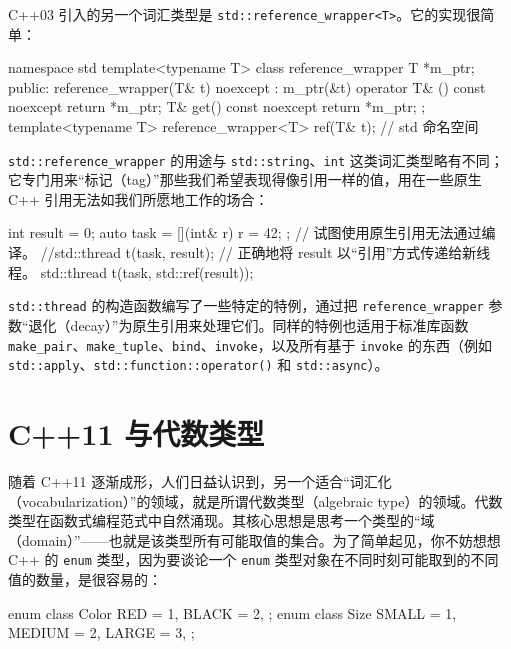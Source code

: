 C++03 引入的另一个词汇类型是 \texttt{std::\allowbreak{}reference\_\allowbreak{}wrapper<\allowbreak{}T>\allowbreak{}}。它的实现很简单：

\begin{codebox}[cpp]
    namespace std {
      template<typename T>
      class reference_wrapper {
        T *m_ptr;
        public:
        reference_wrapper(T& t) noexcept : m_ptr(&t) {}
        operator T& () const noexcept { return *m_ptr; }
        T& get() const noexcept { return *m_ptr; }
      };
      template<typename T>
      reference_wrapper<T> ref(T& t);
    } // std 命名空间
\end{codebox}

\texttt{std::\allowbreak{}reference\_\allowbreak{}wrapper} 的用途与 \texttt{std::\allowbreak{}string}、\texttt{int} 这类词汇类型略有不同；它专门用来“标记（tag）”那些我们希望表现得像引用一样的值，用在一些原生 C++ 引用无法如我们所愿地工作的场合：

\begin{codebox}[cpp]
     int result = 0;
     auto task = [](int& r) {
       r = 42;
     };
     // 试图使用原生引用无法通过编译。
     //std::thread t(task, result);
     // 正确地将 result 以“引用”方式传递给新线程。
     std::thread t(task, std::ref(result));
\end{codebox}

\texttt{std::\allowbreak{}thread} 的构造函数编写了一些特定的特例，通过把 \texttt{reference\_\allowbreak{}wrapper} 参数“退化（decay）”为原生引用来处理它们。同样的特例也适用于标准库函数 \texttt{make\_\allowbreak{}pair}、\texttt{make\_\allowbreak{}tuple}、\texttt{bind}、\texttt{invoke}，以及所有基于 \texttt{invoke} 的东西（例如 \texttt{std::\allowbreak{}apply}、\texttt{std::\allowbreak{}function::\allowbreak{}operator(\allowbreak{})\allowbreak{}} 和 \texttt{std::\allowbreak{}async}）。

\section{C++11 与代数类型}

随着 C++11 逐渐成形，人们日益认识到，另一个适合“词汇化（vocabularization）”的领域，就是所谓代数类型（algebraic type）的领域。代数类型在函数式编程范式中自然涌现。其核心思想是思考一个类型的“域（domain）”——也就是该类型所有可能取值的集合。为了简单起见，你不妨想想 C++ 的 \texttt{enum} 类型，因为要谈论一个 \texttt{enum} 类型对象在不同时刻可能取到的不同值的数量，是很容易的：

\begin{codebox}[cpp]
    enum class Color {
      RED = 1,
      BLACK = 2,
    };
    enum class Size {
      SMALL = 1,
      MEDIUM = 2,
      LARGE = 3,
    };
\end{codebox}

